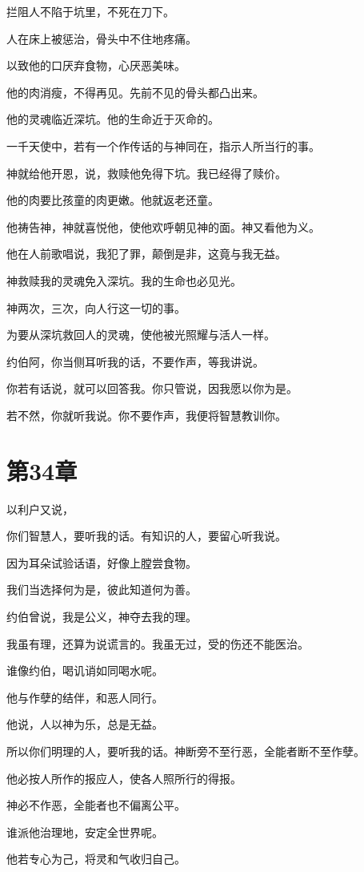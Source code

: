 \documentclass[12pt,oneside]{book}
\begin{document}
拦阻人不陷于坑里，不死在刀下。

人在床上被惩治，骨头中不住地疼痛。

以致他的口厌弃食物，心厌恶美味。

他的肉消瘦，不得再见。先前不见的骨头都凸出来。

他的灵魂临近深坑。他的生命近于灭命的。

一千天使中，若有一个作传话的与神同在，指示人所当行的事。

神就给他开恩，说，救赎他免得下坑。我已经得了赎价。

他的肉要比孩童的肉更嫩。他就返老还童。

他祷告神，神就喜悦他，使他欢呼朝见神的面。神又看他为义。

他在人前歌唱说，我犯了罪，颠倒是非，这竟与我无益。

神救赎我的灵魂免入深坑。我的生命也必见光。

神两次，三次，向人行这一切的事。

为要从深坑救回人的灵魂，使他被光照耀与活人一样。

约伯阿，你当侧耳听我的话，不要作声，等我讲说。

你若有话说，就可以回答我。你只管说，因我愿以你为是。

若不然，你就听我说。你不要作声，我便将智慧教训你。


\chapter{第34章}
以利户又说，

你们智慧人，要听我的话。有知识的人，要留心听我说。

因为耳朵试验话语，好像上膛尝食物。

我们当选择何为是，彼此知道何为善。

约伯曾说，我是公义，神夺去我的理。

我虽有理，还算为说谎言的。我虽无过，受的伤还不能医治。

谁像约伯，喝讥诮如同喝水呢。

他与作孽的结伴，和恶人同行。

他说，人以神为乐，总是无益。

所以你们明理的人，要听我的话。神断旁不至行恶，全能者断不至作孽。

他必按人所作的报应人，使各人照所行的得报。

神必不作恶，全能者也不偏离公平。

谁派他治理地，安定全世界呢。

他若专心为己，将灵和气收归自己。
\end{document}
